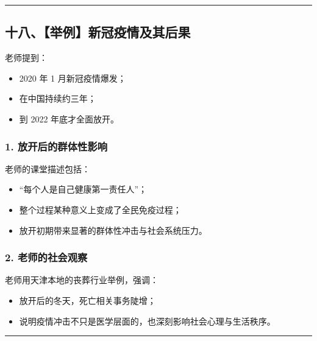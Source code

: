 \documentclass[
  chinese,
  9pt,
  a4paper,
]{ctexart}
\providecommand{\tightlist}{%
  \setlength{\itemsep}{0pt}\setlength{\parskip}{0pt}}
\begin{document}
\begin{center}\rule{0.5\linewidth}{0.5pt}\end{center}

\subsection{十八、【举例】新冠疫情及其后果}\label{ux5341ux516bux4e3eux4f8bux65b0ux51a0ux75abux60c5ux53caux5176ux540eux679c}

老师提到：

\begin{itemize}
\tightlist
\item
  2020 年 1 月新冠疫情爆发；
\item
  在中国持续约三年；
\item
  到 2022 年底才全面放开。
\end{itemize}

\subsubsection{1.
放开后的群体性影响}\label{ux653eux5f00ux540eux7684ux7fa4ux4f53ux6027ux5f71ux54cd}

老师的课堂描述包括：

\begin{itemize}
\tightlist
\item
  ``每个人是自己健康第一责任人''；
\item
  整个过程某种意义上变成了全民免疫过程；
\item
  放开初期带来显著的群体性冲击与社会系统压力。
\end{itemize}

\subsubsection{2.
老师的社会观察}\label{ux8001ux5e08ux7684ux793eux4f1aux89c2ux5bdf}

老师用天津本地的丧葬行业举例，强调：

\begin{itemize}
\tightlist
\item
  放开后的冬天，死亡相关事务陡增；
\item
  说明疫情冲击不只是医学层面的，也深刻影响社会心理与生活秩序。
\end{itemize}

\begin{center}\rule{0.5\linewidth}{0.5pt}\end{center}
\end{document}
